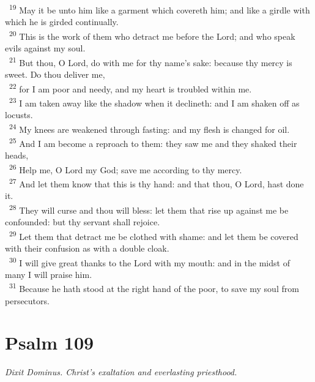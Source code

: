 \documentclass[a5paper,12pt]{article}
\begin{document}
\begin{multicols*}{2}
~\textsuperscript{19} May it be unto him like a garment which covereth him; and like a girdle with which he is girded continually.\\
~\textsuperscript{20} This is the work of them who detract me before the Lord; and who speak evils against my soul.\\
~\textsuperscript{21} But thou, O Lord, do with me for thy name's sake: because thy mercy is sweet. Do thou deliver me,\\
~\textsuperscript{22} for I am poor and needy, and my heart is troubled within me.\\
~\textsuperscript{23} I am taken away like the shadow when it declineth: and I am shaken off as locusts.\\
~\textsuperscript{24} My knees are weakened through fasting: and my flesh is changed for oil.\\
~\textsuperscript{25} And I am become a reproach to them: they saw me and they shaked their heads,\\
~\textsuperscript{26} Help me, O Lord my God; save me according to thy mercy.\\
~\textsuperscript{27} And let them know that this is thy hand: and that thou, O Lord, hast done it.\\
~\textsuperscript{28} They will curse and thou will bless: let them that rise up against me be confounded: but thy servant shall rejoice.\\
~\textsuperscript{29} Let them that detract me be clothed with shame: and let them be covered with their confusion as with a double cloak.\\
~\textsuperscript{30} I will give great thanks to the Lord with my mouth: and in the midst of many I will praise him.\\
~\textsuperscript{31} Because he hath stood at the right hand of the poor, to save my soul from persecutors.\\

\section{Psalm 109}
\label{sec:orgb15b0a0}
\emph{Dixit Dominus. Christ's exaltation and everlasting priesthood.}\\


\end{multicols*}
\end{document}
